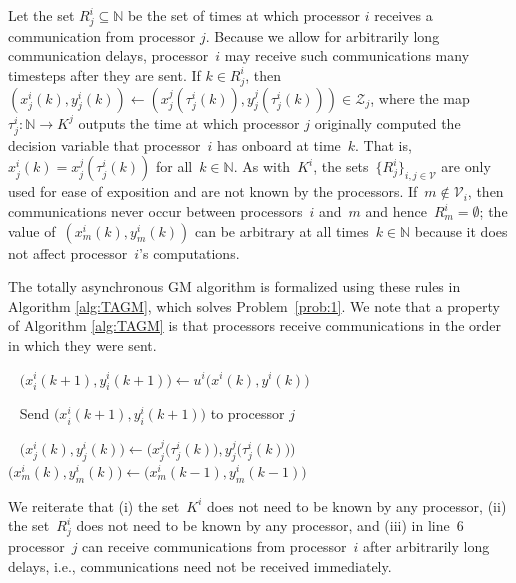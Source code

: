 \documentclass[9pt,shortpaper,twoside,web]{ieeecolor}
\newcommand{\Z}{\ensuremath{\mathcal{Z}}\xspace}
\newcommand{\V}{\ensuremath{\mathcal{V}}\xspace}
\begin{document}
Let the set $R^i_j\subseteq\mathbb N$ be the set of times at which processor $i$ receives a communication from processor $j$. 
Because we allow for arbitrarily long communication delays, processor~$i$ may receive such communications many timesteps after they are sent. 
If $k\in R^i_j$, then $(x^i_j(k),y^i_j(k))\gets ( x^j_j(\tau^i_j(k)),y^j_j(\tau^i_j(k)))\in\Z_j$, where 
the map~$\tau^i_j : \mathbb{N} \to K^j$ outputs the 
time at which processor $j$ originally computed the decision variable that processor~$i$ has onboard at time~$k$.
That is, $x^i_j(k) = x^j_j(\tau^i_j(k))$ for all~$k \in \mathbb{N}$. 
As with~$K^i$, the sets~$\{R^i_j\}_{i, j \in \V}$ are only used for ease of exposition and are not known by the processors. 
If~$m \not\in \V_i$, then communications never occur between processors~$i$ and~$m$
and hence~$R^i_m=\emptyset$; 
the value of~$(x^i_m(k),y^i_m(k))$ can be arbitrary at all times~$k \in \mathbb{N}$
because it does not affect processor~$i$'s computations.

The totally asynchronous GM algorithm is formalized using these rules in Algorithm \ref{alg:TAGM}, which solves
Problem~\ref{prob:1}.
We note that a property of Algorithm \ref{alg:TAGM} is that processors receive communications in the order in which they were sent.

\begin{algorithm}
    \caption{Totally Asynchronous GM Algorithm}
    \label{alg:TAGM}
	\SetAlgoLined
	\KwIn{For $i\in\mathcal{V}$ select an initial state $z^i(0)\in\Z.$}
	{
		{
            { ~\phantom{} $\big(x^i_i(k+1),y^i_i(k+1)\big)\gets u^i\big(x^i(k),y^i(k)\big)$

                { ~\phantom{} Send $\big(x^i_i(k+1),y^i_i(k+1)\big)$ to processor $j$
                }   
			}			
            {
                { ~\phantom{} $\big(x^i_j(k),y^i_j(k)\big)\gets \Big(x^j_j\big(\tau^i_j(k)\big),y^j_j\big(\tau^i_j(k)\big)\Big)$
                }
            }
            { ~\phantom{} $\big(x^i_m(k),y^i_m(k)\big)\gets \big(x^i_m(k-1),y^i_m(k-1)\big)$
            }
		}	
	}
\end{algorithm}

We reiterate that (i) the set~$K^i$ does not need to be known by any processor,
(ii) the set~$R^i_j$ does not need to be known by any processor,
and (iii) in line~$6$ processor~$j$ can receive communications from processor~$i$
after arbitrarily long delays, i.e., communications need not
be received immediately. 
\end{document}

